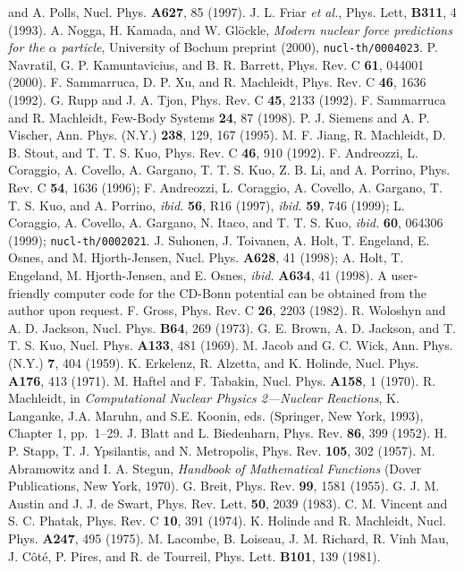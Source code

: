 \begin{references}
and A. Polls, Nucl. Phys. {\bf A627}, 85 (1997).
 J. L. Friar {\it et al.}, Phys. Lett, {\bf B311}, 4 (1993).
 A. Nogga, H. Kamada, and W. Gl\"ockle, {\it Modern
nuclear force predictions for the $\alpha$ particle}, University
of Bochum preprint (2000), {\tt nucl-th/0004023}.
 P. Navratil, G. P. Kamuntavicius, and B. R. Barrett,
Phys. Rev. C {\bf 61}, 044001 (2000).
 F. Sammarruca, D. P. Xu, and R. Machleidt, Phys. Rev. C
{\bf 46}, 1636 (1992).
 G. Rupp and J. A. Tjon, Phys. Rev. C {\bf 45}, 2133 (1992).
 F. Sammarruca and R. Machleidt, Few-Body Systems 
{\bf 24}, 87 (1998).
P. J. Siemens and A. P. Vischer, Ann. Phys. (N.Y.)
{\bf 238}, 129, 167 (1995).
 M. F. Jiang, R. Machleidt, D. B. Stout,
and T. T. S. Kuo, Phys. Rev. C {\bf 46}, 910 (1992).
F. Andreozzi, L. Coraggio, A. Covello, A. Gargano, T. T. S. Kuo,
Z. B. Li, and A. Porrino, 
Phys. Rev. C {\bf 54}, 1636 (1996);
F. Andreozzi, L. Coraggio, A. Covello, A. Gargano, T. T. S. Kuo,
and A. Porrino, 
{\it ibid.} {\bf 56}, R16 (1997),
{\it ibid.} {\bf 59}, 746 (1999);
L. Coraggio, A. Covello, A. Gargano, N. Itaco, and T. T. S. Kuo,
{\it ibid.} {\bf 60}, 064306 (1999);
{\tt nucl-th/0002021}.
J. Suhonen, J. Toivanen, A. Holt, T. Engeland, E. Osnes, and M. Hjorth-Jensen,
Nucl. Phys. {\bf A628}, 41 (1998);
A. Holt, T. Engeland, M. Hjorth-Jensen, and E. Osnes,
{\it ibid.} {\bf A634}, 41 (1998).
 A user-friendly computer code for the CD-Bonn potential
can be obtained from the author upon request.
 F. Gross, Phys. Rev. C {\bf 26}, 2203 (1982).
 R. Woloshyn and A. D. Jackson, Nucl. Phys. {\bf B64}, 269 
(1973).
 G. E. Brown, A. D. Jackson, and T. T. S. Kuo, Nucl. Phys. {\bf 
A133}, 481 (1969).
 M. Jacob and G. C. Wick, Ann. Phys. (N.Y.) {\bf 7}, 404 (1959).
 K. Erkelenz, R. Alzetta, and K. Holinde, Nucl. Phys. {\bf 
A176}, 413 (1971).
 M. Haftel and F. Tabakin,
Nucl. Phys. {\bf A158}, 1 (1970).
 R. Machleidt, in {\it Computational Nuclear 
Physics 2---Nuclear Reactions}, K. Langanke, J.A. Maruhn, and S.E. Koonin,
eds. (Springer, New York, 1993), Chapter 1, pp.\ 1--29.
 J. Blatt and L. Biedenharn, Phys. Rev. {\bf 86}, 399 (1952).
 H. P. Stapp, T. J. Ypsilantis, and N. Metropolis, Phys. Rev. 
{\bf 105}, 302 (1957).
 M. Abramowitz and I. A. Stegun, {\it Handbook of Mathematical
Functions} (Dover Publications, New York, 1970).
 G. Breit, Phys. Rev. {\bf 99}, 1581 (1955).
 G. J. M. Austin and J. J. de Swart, Phys. Rev. Lett.
{\bf 50}, 2039 (1983).
 C. M. Vincent and S. C. Phatak, Phys. Rev. C 
{\bf 10}, 391 (1974).
 K. Holinde and R. Machleidt, Nucl. Phys. {\bf A247}, 495 (1975).
 M. Lacombe, B. Loiseau, J. M. Richard, R. Vinh Mau,
J. C\^{o}t\'{e}, P. Pires, and R. de Tourreil, Phys. Lett.
{\bf B101}, 139 (1981).
\end{references}


